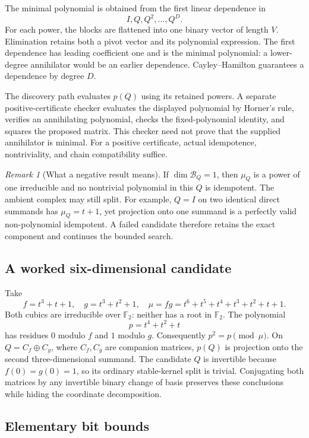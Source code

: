 \documentclass[11pt,a4paper]{article}
\theoremstyle{definition}\newtheorem{definition}[theorem]{Definition}
\theoremstyle{remark}\newtheorem{remark}[theorem]{Remark}
\newcommand{\F}{\mathbb F_2}
\begin{document}
The minimal polynomial is obtained from the first linear dependence in
\[
 I,Q,Q^2,\ldots,Q^D.
\]
For each power, the blocks are flattened into one binary vector of length
$V$. Elimination retains both a pivot vector and its polynomial expression.
The first dependence has leading coefficient one and is the minimal
polynomial: a lower-degree annihilator would be an earlier dependence.
Cayley--Hamilton guarantees a dependence by degree $D$.

The discovery path evaluates $p(Q)$ using its retained powers. A separate
positive-certificate checker evaluates the displayed polynomial by Horner's
rule, verifies an annihilating polynomial, checks the fixed-polynomial
identity, and squares the proposed matrix. This checker need not prove that
the supplied annihilator is minimal. For a positive certificate, actual
idempotence, nontriviality, and chain compatibility suffice.

\begin{remark}[What a negative result means]\label{rem:negative}
If $\dim\mathcal B_Q=1$, then $\mu_Q$ is a power of one irreducible and no
nontrivial polynomial in this $Q$ is idempotent. The ambient complex may
still split. For example, $Q=I$ on two identical direct summands has
$\mu_Q=t+1$, yet projection onto one summand is a perfectly valid
non-polynomial idempotent. A failed candidate therefore retains the exact
component and continues the bounded search.
\end{remark}

\subsection{A worked six-dimensional candidate}

Take
\[
 f=t^3+t+1,\quad g=t^3+t^2+1,\quad
 \mu=fg=t^6+t^5+t^4+t^3+t^2+t+1.
\]
Both cubics are irreducible over $\F$: neither has a root in $\F$.
The polynomial
\[
 p=t^4+t^2+t
\]
has residues $0$ modulo $f$ and $1$ modulo $g$. Consequently
$p^2=p\pmod\mu$. On $Q=C_f\oplus C_g$, where $C_f,C_g$ are companion
matrices, $p(Q)$ is projection onto the second three-dimensional summand.
The candidate $Q$ is invertible because $f(0)=g(0)=1$, so its ordinary
stable-kernel split is trivial. Conjugating both matrices by any invertible
binary change of basis preserves these conclusions while hiding the
coordinate decomposition.

\subsection{Elementary bit bounds}
\end{document}
